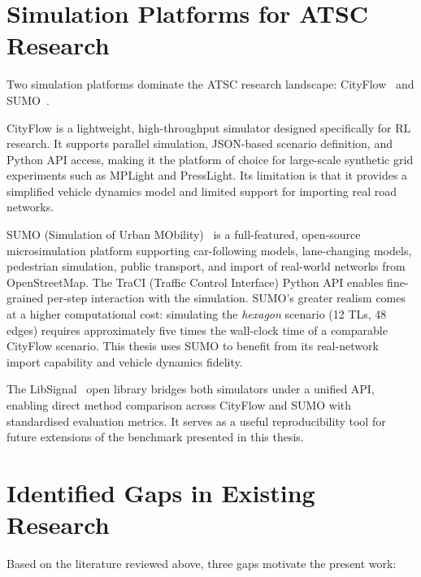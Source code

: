 \documentclass[12pt,oneside,a4paper]{report}
\begin{document}
\section{Simulation Platforms for ATSC Research}
\label{sec:lit_sim}

Two simulation platforms dominate the ATSC research landscape:
CityFlow~\cite{cityflow2019} and SUMO~\cite{sumo2018}.

CityFlow is a lightweight, high-throughput simulator designed
specifically for RL research.  It supports parallel simulation,
JSON-based scenario definition, and Python API access, making it
the platform of choice for large-scale synthetic grid experiments
such as MPLight and PressLight.  Its limitation is that it provides
a simplified vehicle dynamics model and limited support for
importing real road networks.

SUMO (Simulation of Urban MObility)~\cite{sumo2018} is a
full-featured, open-source microsimulation platform supporting
car-following models, lane-changing models, pedestrian simulation,
public transport, and import of real-world networks from
OpenStreetMap.  The TraCI (Traffic Control Interface) Python API
enables fine-grained per-step interaction with the simulation.
SUMO's greater realism comes at a higher computational cost:
simulating the \textit{hexagon} scenario (12 TLs, 48 edges)
requires approximately five times the wall-clock time of a
comparable CityFlow scenario.  This thesis uses SUMO to benefit
from its real-network import capability and vehicle dynamics
fidelity.

The LibSignal~\cite{libsignal2022} open library bridges both
simulators under a unified API, enabling direct method comparison
across CityFlow and SUMO with standardised evaluation metrics.
It serves as a useful reproducibility tool for future extensions
of the benchmark presented in this thesis.

\section{Identified Gaps in Existing Research}
\label{sec:lit_gaps}

Based on the literature reviewed above, three gaps motivate
the present work:
\end{document}
